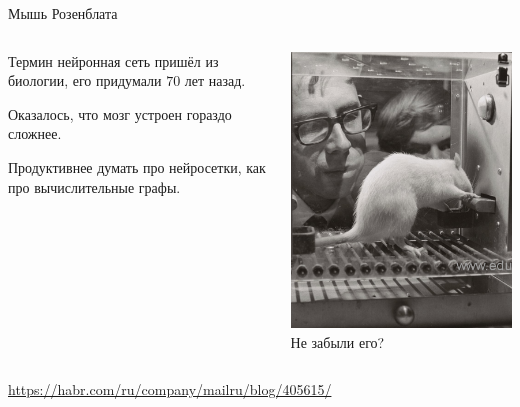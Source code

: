 \documentclass[notes,12pt, aspectratio=169]{beamer}
\newenvironment{wideitemize}{\itemize\addtolength{\itemsep}{10pt}}{\enditemize}
\begin{document}
\begin{frame}{Мышь Розенблата}
\begin{columns}[T] 
\begin{column}{.49\textwidth}
	\begin{wideitemize}
		\item Термин нейронная сеть пришёл из биологии, его придумали $70$ лет назад.  
		\item  Оказалось, что мозг устроен гораздо сложнее.
		\item  Продуктивнее думать про нейросетки,  как про вычислительные графы. 
	\end{wideitemize}
\end{column}
\begin{column}{.49\textwidth}
	\begin{center}
		\includegraphics[scale=0.35]{rozen_mouse.png}  \\ 
		\Large \alert{Не забыли его?} 
	\end{center}
\end{column}
\end{columns}
\vfill %
\footnotesize 
\color{blue} \url{https://habr.com/ru/company/mailru/blog/405615/}
\end{frame}
\end{document}
